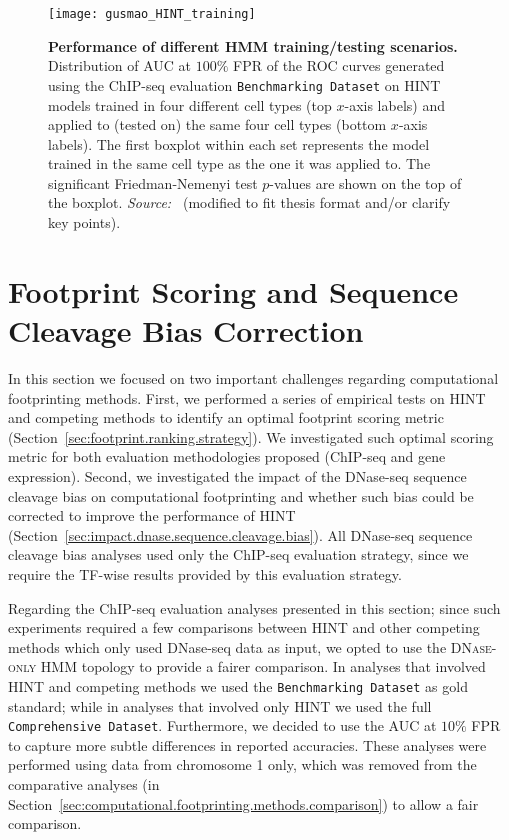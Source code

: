 \begin{figure}[h!]
\centering
\texttt{[image: gusmao\_HINT\_training]}
\caption[Performance of different HMM training/testing scenarios]{\textbf{Performance of different HMM training/testing scenarios.} Distribution of AUC at $100\%$ FPR of the ROC curves generated using the ChIP-seq evaluation {\tt Benchmarking Dataset} on HINT models trained in four different cell types (top $x$-axis labels) and applied to (tested on) the same four cell types (bottom $x$-axis labels). The first boxplot within each set represents the model trained in the same cell type as the one it was applied to. The significant Friedman-Nemenyi test $p$-values are shown on the top of the boxplot. \emph{Source:~\cite{gusmao2014}} (modified to fit thesis format and/or clarify key points).}
\label{fig:gusmao_HINT_training}
\end{figure}

\section{Footprint Scoring and Sequence Cleavage Bias Correction}
\label{sec:second.footrank.biascorr}

In this section we focused on two important challenges regarding computational footprinting methods. First, we performed a series of empirical tests on HINT and competing methods to identify an optimal footprint scoring metric (Section~\ref{sec:footprint.ranking.strategy}). We investigated such optimal scoring metric for both evaluation methodologies proposed (ChIP-seq and gene expression). Second, we investigated the impact of the DNase-seq sequence cleavage bias on computational footprinting and whether such bias could be corrected to improve the performance of HINT (Section~\ref{sec:impact.dnase.sequence.cleavage.bias}). All DNase-seq sequence cleavage bias analyses used only the ChIP-seq evaluation strategy, since we require the TF-wise results provided by this evaluation strategy.

Regarding the ChIP-seq evaluation analyses presented in this section; since such experiments required a few comparisons between HINT and other competing methods which only used DNase-seq data as input, we opted to use the \textsc{DNase-only} HMM topology to provide a fairer comparison. In analyses that involved HINT and competing methods we used the {\tt Benchmarking Dataset} as gold standard; while in analyses that involved only HINT we used the full {\tt Comprehensive Dataset}. Furthermore, we decided to use the AUC at $10\%$ FPR to capture more subtle differences in reported accuracies. These analyses were performed using data from chromosome 1 only, which was removed from the comparative analyses (in Section~\ref{sec:computational.footprinting.methods.comparison}) to allow a fair comparison.

